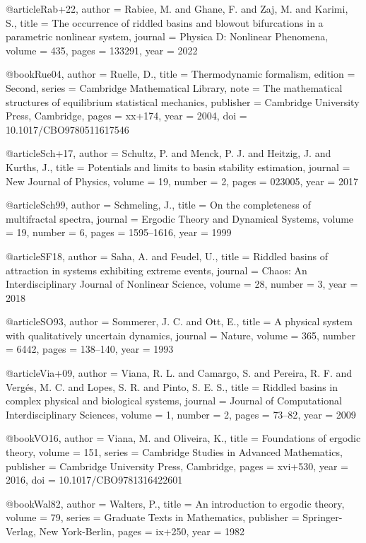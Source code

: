 @article{Rab+22,
  author = {Rabiee, M. and Ghane, F. and Zaj, M. and Karimi, S.},
  title = {The occurrence of riddled basins and blowout bifurcations in a parametric nonlinear system},
  journal = {Physica D: Nonlinear Phenomena},
  volume = {435},
  pages = {133291},
  year = {2022}
}

@book{Rue04,
  author = {Ruelle, D.},
  title = {Thermodynamic formalism},
  edition = {Second},
  series = {Cambridge Mathematical Library},
  note = {The mathematical structures of equilibrium statistical mechanics},
  publisher = {Cambridge University Press, Cambridge},
  pages = {xx+174},
  year = {2004},
  doi = {10.1017/CBO9780511617546}
}

@article{Sch+17,
  author = {Schultz, P. and Menck, P. J. and Heitzig, J. and Kurths, J.},
  title = {Potentials and limits to basin stability estimation},
  journal = {New Journal of Physics},
  volume = {19},
  number = {2},
  pages = {023005},
  year = {2017}
}

@article{Sch99,
  author = {Schmeling, J.},
  title = {On the completeness of multifractal spectra},
  journal = {Ergodic Theory and Dynamical Systems},
  volume = {19},
  number = {6},
  pages = {1595--1616},
  year = {1999}
}

@article{SF18,
  author = {Saha, A. and Feudel, U.},
  title = {Riddled basins of attraction in systems exhibiting extreme events},
  journal = {Chaos: An Interdisciplinary Journal of Nonlinear Science},
  volume = {28},
  number = {3},
  year = {2018}
}

@article{SO93,
  author = {Sommerer, J. C. and Ott, E.},
  title = {A physical system with qualitatively uncertain dynamics},
  journal = {Nature},
  volume = {365},
  number = {6442},
  pages = {138--140},
  year = {1993}
}

@article{Via+09,
  author = {Viana, R. L. and Camargo, S. and Pereira, R. F. and Verg{\'e}s, M. C. and Lopes, S. R. and Pinto, S. E. S.},
  title = {Riddled basins in complex physical and biological systems},
  journal = {Journal of Computational Interdisciplinary Sciences},
  volume = {1},
  number = {2},
  pages = {73--82},
  year = {2009}
}

@book{VO16,
  author = {Viana, M. and Oliveira, K.},
  title = {Foundations of ergodic theory},
  volume = {151},
  series = {Cambridge Studies in Advanced Mathematics},
  publisher = {Cambridge University Press, Cambridge},
  pages = {xvi+530},
  year = {2016},
  doi = {10.1017/CBO9781316422601}
}

@book{Wal82,
  author = {Walters, P.},
  title = {An introduction to ergodic theory},
  volume = {79},
  series = {Graduate Texts in Mathematics},
  publisher = {Springer-Verlag, New York-Berlin},
  pages = {ix+250},
  year = {1982}
}

